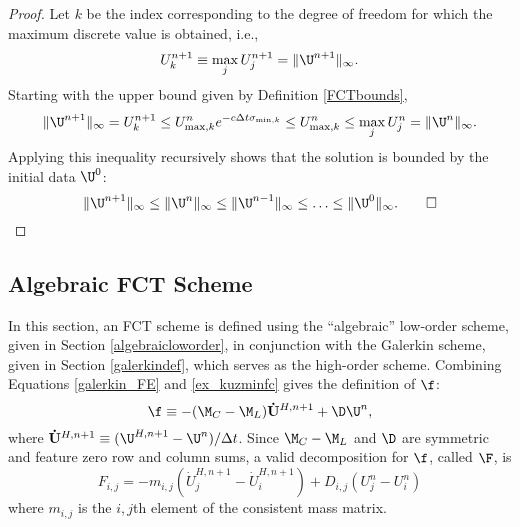 \begin{proof}
   Let $k$ be the index corresponding to the degree of freedom for which
   the maximum discrete value is obtained, i.e.,
   \[
      U_k^{n+1}\equiv\max\limits_j U_j^{n+1}=\|\U^{n+1}\|_\infty.
   \]
   Starting with the upper bound given by Definition \ref{FCTbounds},
   \[
      \|\U^{n+1}\|_\infty = U_k^{n+1} \le
      U_{\max,k}^n e^{-c\Delta t\sigma_{\min,k}} \le
      U_{\max,k}^n \le
      \max\limits_j U_j^n = \|\U^{n}\|_\infty.
   \]
   Applying this inequality recursively shows that the solution is bounded
   by the initial data $\U^0$:
   \[
      \|\U^{n+1}\|_\infty\le
      \|\U^{n}\|_\infty\le
      \|\U^{n-1}\|_\infty\le\ldots\le
      \|\U^{0}\|_\infty.\qed
   \]
\end{proof}
\subsection{Algebraic FCT Scheme}\label{algebraicFCT}
In this section, an FCT scheme is defined using the ``algebraic'' low-order
scheme, given in Section \ref{algebraicloworder}, in conjunction with the
Galerkin scheme, given in Section \ref{galerkindef}, which serves as the
high-order scheme. Combining Equations \eqref{galerkin_FE} and
\eqref{ex_kuzminfc} gives the definition of $\f$:
\begin{equation}\label{ex_kuzminFdef}
   \f \equiv -(\M_C-\M_L)\mathbf{\dot{U}}^{H,n+1}
      +\D\U^n,
\end{equation}
where $\mathbf{\dot{U}}^{H,n+1} \equiv (\U^{H,n+1} - \U^n)/\Delta t$.
Since $\M_C-\M_L$ and $\D$ are symmetric
and feature zero row and column sums, a valid decomposition for $\f$,
called $\F$, is
\begin{equation}
   F_{i,j} = -m_{i,j}(\dot{U}^{H,n+1}_j - \dot{U}^{H,n+1}_i)
   + D_{i,j}(U^n_j - U^n_i)
\end{equation}
where $m_{i,j}$ is the $i,j$th element of the consistent mass matrix.
